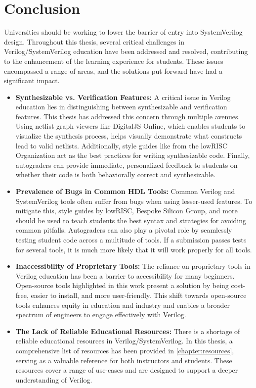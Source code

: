 
\chapter{Conclusion}
\label{chapter:conclusion}

Universities should be working to lower the barrier of entry into SystemVerilog design. Throughout this thesis, several critical challenges in Verilog/SystemVerilog education have been addressed and resolved, contributing to the enhancement of the learning experience for students. These issues encompassed a range of areas, and the solutions put forward have had a significant impact.

\begin{itemize}
    \item \textbf{Synthesizable vs. Verification Features:} A critical issue in Verilog education lies in distinguishing between synthesizable and verification features. This thesis has addressed this concern through multiple avenues. Using netlist graph viewers like DigitalJS Online, which enables students to visualize the synthesis process, helps visually demonstrate what constructs lead to valid netlists. Additionally, style guides like from the lowRISC Organization act as the best practices for writing synthesizable code. Finally, autograders can provide immediate, personalized feedback to students on whether their code is both behaviorally correct and synthesizable.
    \item \textbf{Prevalence of Bugs in Common HDL Tools:} Common Verilog and SystemVerilog tools often suffer from bugs when using lesser-used features. To mitigate this, style guides by lowRISC, Bespoke Silicon Group, and more should be used to teach students the best syntax and strategies for avoiding common pitfalls. Autograders can also play a pivotal role by seamlessly testing student code across a multitude of tools. If a submission passes tests for several tools, it is much more likely that it will work properly for all tools.
    \item \textbf{Inaccessibility of Proprietary Tools:} The reliance on proprietary tools in Verilog education has been a barrier to accessibility for many beginners. Open-source tools highlighted in this work present a solution by being cost-free, easier to install, and more user-friendly. This shift towards open-source tools enhances equity in education and industry and enables a broader spectrum of engineers to engage effectively with Verilog.
    \item \textbf{The Lack of Reliable Educational Resources:} There is a shortage of reliable educational resources in Verilog/SystemVerilog. In this thesis, a comprehensive list of resources has been provided in \autoref{chapter:resources}, serving as a valuable reference for both instructors and students. These resources cover a range of use-cases and are designed to support a deeper understanding of Verilog.

\end{itemize}
